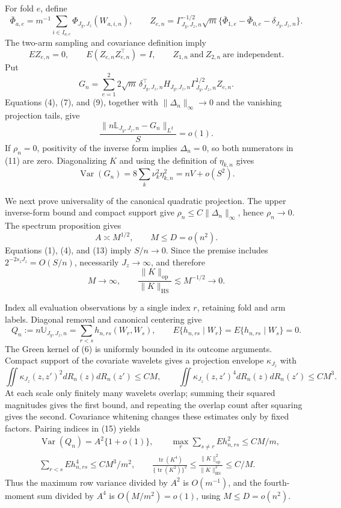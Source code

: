 For fold \(e\), define
\[
\bar\Phi_{a,e}=m^{-1}\sum_{i\in I_{a,e}}\Phi_{J_y,J_z}(W_{a,i,n}),
\qquad
Z_{e,n}=\Gamma_{J_y,J_z,n}^{-1/2}\sqrt m
\{\bar\Phi_{1,e}-\bar\Phi_{0,e}-\delta_{J_y,J_z,n}\}.                    \tag{8}
\]
The two-arm sampling and covariance definition imply
\[
EZ_{e,n}=0,\qquad E(Z_{e,n}Z_{e,n}^\top)=I,
\qquad Z_{1,n}\ \text{and}\ Z_{2,n}\ \text{are independent}.            \tag{9}
\]
Put
\[
G_n=\sum_{e=1}^2 2\sqrt m\,\delta_{J_y,J_z,n}^\top
H_{J_y,J_z,n}\Gamma_{J_y,J_z,n}^{1/2}Z_{e,n}.                             \tag{10}
\]
Equations (4), (7), and (9), together with \(\|\Delta_n\|_\infty\to0\) and the vanishing projection tails, give
\[
\frac{\|n\mathbb L_{J_y,J_z,n}-G_n\|_{L^2}}S=o(1).                       \tag{11}
\]
If \(\rho_n=0\), positivity of the inverse form implies \(\Delta_n=0\), so both numerators in (11) are zero.  Diagonalizing \(K\) and using the definition of \(\eta_{k,n}\) gives
\[
\operatorname{Var}(G_n)=8\sum_k\nu_k^2\eta_{k,n}^2=nV+o(S^2).            \tag{12}
\]

We next prove universality of the canonical quadratic projection.  The upper inverse-form bound and compact support give \(\rho_n\le C\|\Delta_n\|_\infty\), hence \(\rho_n\to0\).  The spectrum proposition gives
\[
A\asymp M^{1/2},\qquad M\le D=o(n^2).                                    \tag{13}
\]
Equations (1), (4), and (13) imply \(S/n\to0\).  Since the premise includes \(2^{-2s_zJ_z}=O(S/n)\), necessarily \(J_z\to\infty\), and therefore
\[
M\to\infty,
\qquad
\frac{\|K\|_{\mathrm{op}}}{\|K\|_{\mathrm{HS}}}\lesssim M^{-1/2}\to0. \tag{14}
\]

Index all evaluation observations by a single index \(r\), retaining fold and arm labels.  Diagonal removal and canonical centering give
\[
Q_n:=n\mathbb U_{J_y,J_z,n}=\sum_{r<s}h_{n,rs}(W_r,W_s),
\qquad E\{h_{n,rs}\mid W_r\}=E\{h_{n,rs}\mid W_s\}=0.                  \tag{15}
\]
The Green kernel of (6) is uniformly bounded in its outcome arguments.  Compact support of the covariate wavelets gives a projection envelope \(\kappa_{J_z}\) with
\[
\iint\kappa_{J_z}(z,z')^2dR_n(z)dR_n(z')\le CM,
\qquad
\iint\kappa_{J_z}(z,z')^4dR_n(z)dR_n(z')\le CM^3.                        \tag{16}
\]
At each scale only finitely many wavelets overlap; summing their squared magnitudes gives the first bound, and repeating the overlap count after squaring gives the second.  Covariance whitening changes these estimates only by fixed factors.  Pairing indices in (15) yields
\[
\begin{aligned}
&\operatorname{Var}(Q_n)=A^2\{1+o(1)\},
\qquad \max_r\sum_{s\ne r}Eh_{n,rs}^2\le C M/m,\\
&\sum_{r<s}Eh_{n,rs}^4\le CM^3/m^2,
\qquad
\frac{\operatorname{tr}(K^4)}{\{\operatorname{tr}(K^2)\}^2}
\le\frac{\|K\|_{\mathrm{op}}^2}{\|K\|_{\mathrm{HS}}^2}\le C/M.
\end{aligned}                                                             \tag{17}
\]
Thus the maximum row variance divided by \(A^2\) is \(O(m^{-1})\), and the fourth-moment sum divided by \(A^4\) is \(O(M/m^2)=o(1)\), using \(M\le D=o(n^2)\).


